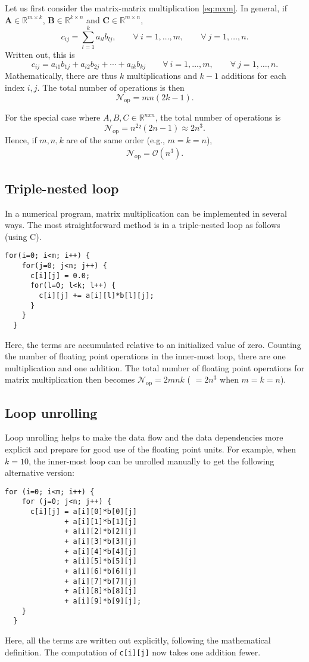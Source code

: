 Let us first consider the matrix-matrix multiplication \eqref{eq:mxm}. In
general, if $\bm A \in \mathbb{R}^{m \times k}$, $\bm B \in \mathbb{R}^{k \times
n}$ and $\bm C \in \mathbb{R}^{m \times n}$,
\[
  c_{ij} = \sum_{l=1}^k a_{il}b_{lj}, \qquad
  \forall\ i=1,\ldots,m, \qquad
  \forall\ j=1,\ldots,n.
\]
Written out, this is
\[
  c_{ij} = a_{i1}b_{1j} + a_{i2}b_{2j}+\cdots+a_{ik}b_{kj} \qquad
  \forall\ i=1,\ldots,m, \qquad
  \forall\ j=1,\ldots,n.
\]
Mathematically, there are thus $k$ multiplications and $k-1$ additions for each
index $i,j$. The total number of operations is then
\[
  \mathcal{N}_\text{op} = mn\left(2k-1\right).
\]

For the special case where $A,B,C\in \mathbb{R}^{nxn}$, the total number of operations is
\[
  \mathcal{N}_\text{op} = n^2²\left(2n-1\right) \approx 2n^3.
\]
Hence, if $m,n,k$ are of the same order (e.g., $m=k=n$),
\begin{align}
  \mathcal{N}_\text{op} = \mathcal{O}(n^3).
\end{align}

\subsection{Triple-nested loop}

In a numerical program, matrix multiplication can be implemented in several ways.
The most straightforward method is in a triple-nested loop as follows (using C).
\begin{lstlisting}[style=c]
  for(i=0; i<m; i++) {
    for(j=0; j<n; j++) {
      c[i][j] = 0.0;
      for(l=0; l<k; l++) {
        c[i][j] += a[i][l]*b[l][j];
      }
    }
  }
\end{lstlisting}
Here, the terms are accumulated relative to an initialized value of zero.
Counting the number of floating point operations in the inner-most loop, there
are one multiplication and one addition. The total number of floating point
operations for matrix multiplication then becomes $\mathcal{N}_\text{op} = 2mnk$
( $=2n^3$ when $m=k=n$).

\subsection{Loop unrolling}

Loop unrolling helps to make the data flow and the data dependencies more
explicit and prepare for good use of the floating point units. For example, when
$k=10$, the inner-most loop can be unrolled manually to get the following
alternative version:
\begin{lstlisting}[style=c]
  for (i=0; i<m; i++) {
    for (j=0; j<n; j++) {
      c[i][j] = a[i][0]*b[0][j]
              + a[i][1]*b[1][j]
              + a[i][2]*b[2][j]
              + a[i][3]*b[3][j]
              + a[i][4]*b[4][j]
              + a[i][5]*b[5][j]
              + a[i][6]*b[6][j]
              + a[i][7]*b[7][j]
              + a[i][8]*b[8][j]
              + a[i][9]*b[9][j];
    }
  }
\end{lstlisting}
Here, all the terms are written out explicitly, following the mathematical
definition. The computation of \texttt{c[i][j]} now takes one addition fewer.

